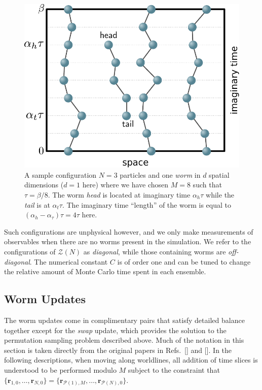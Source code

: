 \documentclass[prb,aps,amssym,nofootinbib,floatfix,notitlepage]{revtex4-1}
\renewcommand{\vec}[1]{\boldsymbol{#1}}
\begin{document}
\begin{figure}
\begin{center}
\includegraphics[width=0.40\columnwidth]{Figures/worm.pdf}
\end{center}
\caption{A sample configuration $N=3$ particles and one \emph{worm} in $d$
spatial dimensions ($d=1$ here) where we have chosen $M=8$ such that $\tau
= \beta/8$. The worm \emph{head} is located at imaginary time $\alpha_h \tau$ while
the \emph{tail} is at $\alpha_t \tau$. The imaginary time ``length'' of the worm is
equal to $(\alpha_h-\alpha_\tau)\tau = 4\tau$ here.}
\label{fig:worm}
 \end{figure}
%
Such configurations are unphysical however, and we only make measurements of
observables when there are no worms present in the simulation. We refer to the
configurations of $\mathcal{Z}(N)$ as \emph{diagonal}, while those containing
worms are \emph{off-diagonal}. The numerical constant $C$ is of order one and
can be tuned to change the relative amount of Monte Carlo time spent in each
ensemble. 


\subsection{Worm Updates}
The worm updates come in complimentary pairs that satisfy detailed balance
together except for the \emph{swap} update, which provides the solution to the
permutation sampling problem described above. Much of the notation in this
section is taken directly from the original papers in
Refs.~[] and [].
In the following descriptions, when moving along worldlines, all addition of
time slices is understood to be performed modulo $M$ subject to the constraint
that $\{\vec{r}_{1,0},\ldots,\vec{r}_{N,0}\} = 
\{\vec{r}_{{\mathcal{P}}(1),M},\ldots,\vec{r}_{{\mathcal{P}}(N),0}\}$.
\end{document}
